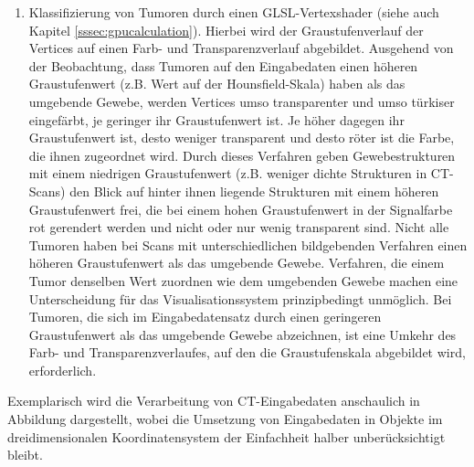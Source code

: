 \documentclass[ngerman,pdftex,paper=A4,DIV=calc,titlepage,12pt]{scrartcl}
\newtheorem[L]{boxedDefinition}{Definition}
\begin{document}
\begin{enumerate}
 \item Klassifizierung von Tumoren durch einen GLSL-Vertexshader (siehe auch Kapitel \vref{sssec:gpucalculation}). Hierbei wird der Graustufenverlauf der Vertices auf einen Farb- und Transparenzverlauf abgebildet. Ausgehend von der Beobachtung, dass Tumoren auf den Eingabedaten einen höheren Graustufenwert (z.B. Wert auf der Hounsfield-Skala) haben als das umgebende Gewebe, werden Vertices umso transparenter und umso türkiser eingefärbt, je geringer ihr Graustufenwert ist. Je höher dagegen ihr Graustufenwert ist, desto weniger transparent und desto röter ist die Farbe, die ihnen zugeordnet wird. Durch dieses Verfahren geben Gewebestrukturen mit einem niedrigen Graustufenwert (z.B. weniger dichte Strukturen in CT-Scans) den Blick auf hinter ihnen liegende Strukturen mit einem höheren Graustufenwert frei, die bei einem hohen Graustufenwert in der Signalfarbe rot gerendert werden und nicht oder nur wenig transparent sind. Nicht alle Tumoren haben bei Scans mit unterschiedlichen bildgebenden Verfahren einen höheren Graustufenwert als das umgebende Gewebe. Verfahren, die einem Tumor denselben Wert zuordnen wie dem umgebenden Gewebe machen eine Unterscheidung für das Visualisationssystem prinzipbedingt unmöglich. Bei Tumoren, die sich im Eingabedatensatz durch einen geringeren Graustufenwert als das umgebende Gewebe abzeichnen, ist eine Umkehr des Farb- und Transparenzverlaufes, auf den die Graustufenskala abgebildet wird, erforderlich.
\end{enumerate}
Exemplarisch wird die Verarbeitung von CT-Eingabedaten anschaulich in Abbildung  dargestellt, wobei die Umsetzung von Eingabedaten in Objekte im dreidimensionalen Koordinatensystem der Einfachheit halber unberücksichtigt bleibt.
\end{document}
